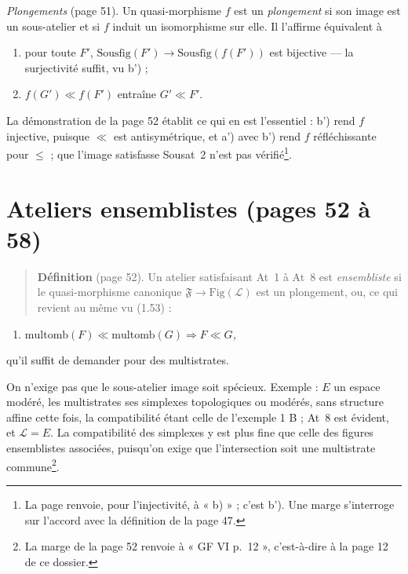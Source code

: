 \documentclass[11pt,a4paper]{article}
\begin{document}
\emph{Plongements} (page 51). Un quasi-morphisme $f$ est un \emph{plongement} si
son image est un sous-atelier et si $f$ induit un isomorphisme sur elle. Il
l'affirme équivalent à
\begin{enumerate}
\item[a')] pour toute $F'$, $\mathrm{Sousfig}(F') \to \mathrm{Sousfig}(f(F'))$
est bijective --- la surjectivité suffit, vu b') ;
\item[b')] $f(G') \ll f(F')$ entraîne $G' \ll F'$.
\end{enumerate}
La démonstration de la page 52 établit ce qui en est l'essentiel : b') rend $f$
injective, puisque $\ll$ est antisymétrique, et a') avec b') rend $f$
réfléchissante pour $\leq$ ; que l'image satisfasse Sousat~2 n'est pas
vérifié\footnote{La page renvoie, pour l'injectivité, à « b) » ; c'est b'). Une
marge s'interroge sur l'accord avec la définition de la page 47.}.

\section*{Ateliers ensemblistes (pages 52 à 58)}

\begin{quote}
\textbf{Définition} (page 52). Un atelier satisfaisant At~1 à At~8 est
\emph{ensembliste} si le quasi-morphisme canonique $\mathfrak{F} \to
\mathrm{Fig}(\mathcal{L})$ est un plongement, ou, ce qui revient au même vu
(1.53) :
\end{quote}
\begin{enumerate}
\item[At ens~1] \emph{$\mathrm{multomb}(F) \ll \mathrm{multomb}(G) \Rightarrow F
\ll G$,}
\end{enumerate}
qu'il suffit de demander pour des multistrates.

On n'exige pas que le sous-atelier image soit spécieux. Exemple : $E$ un espace
modéré, les multistrates ses simplexes topologiques ou modérés, sans structure
affine cette fois, la compatibilité étant celle de l'exemple 1 B ; At~8 est
évident, et $\mathcal{L} = E$. La compatibilité des simplexes y est plus fine
que celle des figures ensemblistes associées, puisqu'on exige que
l'intersection soit une multistrate commune\footnote{La marge de la page 52
renvoie à « GF VI p.~12 », c'est-à-dire à la page 12 de ce dossier.}.
\end{document}
